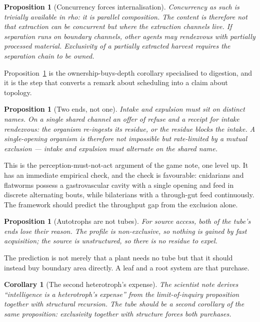 \documentclass[11pt]{article}
\theoremstyle{plain}
\newtheorem{proposition}[theorem]{Proposition}
\newtheorem{corollary}[theorem]{Corollary}
\theoremstyle{definition}
\newcommand{\rhoc}{\textsf{rho}}
\begin{document}
\begin{proposition}[Concurrency forces internalisation]
\label{prop:C}
Concurrency as such is trivially available in \rhoc{}: it is parallel composition. The content is
therefore not that extraction \emph{can} be concurrent but \emph{where the extraction channels live}.
If separation runs on boundary channels, other agents may rendezvous with partially processed
material. Exclusivity of a partially extracted harvest requires the separation chain to be owned.
\end{proposition}

Proposition~\ref{prop:C} is the ownership-buys-depth corollary specialised to digestion, and it is the
step that converts a remark about scheduling into a claim about topology.

\begin{proposition}[Two ends, not one]
\label{prop:D}
Intake and expulsion must sit on distinct names. On a single shared channel an offer of refuse and a
receipt for intake rendezvous: the organism re-ingests its residue, or the residue blocks the intake.
A single-opening organism is therefore not impossible but rate-limited by a mutual exclusion --- intake
and expulsion must alternate on the shared name.
\end{proposition}

This is the perception-must-not-act argument of the game note, one level up. It has an immediate
empirical check, and the check is favourable: cnidarians and flatworms possess a gastrovascular cavity
with a single opening and feed in discrete alternating bouts, while bilaterians with a through-gut feed
continuously. The framework should predict the throughput gap from the exclusion alone.

\begin{proposition}[Autotrophs are not tubes]
\label{prop:E}
For source access, both of the tube's ends lose their reason. The profile is non-exclusive, so nothing
is gained by fast acquisition; the source is unstructured, so there is no residue to expel.
\end{proposition}

The prediction is not merely that a plant needs no tube but that it should instead buy boundary area
directly. A leaf and a root system are that purchase.

\begin{corollary}[The second heterotroph's expense]
\label{cor:F}
The scientist note derives ``intelligence is a heterotroph's expense'' from the limit-of-inquiry
proposition together with structural recursion. The tube should be a second corollary of the same
proposition: exclusivity together with structure forces both purchases.
\end{corollary}
\end{document}
